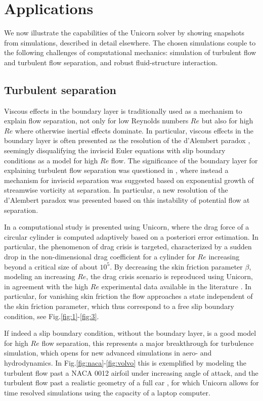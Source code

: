 \section{Applications}

We now illustrate the capabilities of the Unicorn solver by showing
snapshots from simulations, described in detail elsewhere. The chosen
simulations couple to the following challenges of computational
mechanics: simulation of turbulent flow and turbulent flow separation,
and robust fluid-structure interaction.

\subsection{Turbulent separation}

Viscous effects in the boundary layer is traditionally used as a
mechanism to explain flow separation, not only for low Reynolds
numbers $Re$ but also for high $Re$ where otherwise inertial effects
dominate. In particular, viscous effects in the boundary layer is
often presented as the resolution of the d'Alembert
paradox \cite{Stewartson1981}, seemingly disqualifying the inviscid
Euler equations with slip boundary conditions as a model for high $Re$
flow.
%
The significance of the boundary layer for explaining turbulent flow
separation was questioned in \cite{HoffmanJohnson2008b}, where instead
a mechanism for inviscid separation was suggested based on exponential
growth of streamwise vorticity at separation. In particular, a new
resolution of the d'Alembert paradox was presented based on this
instability of potential flow at separation.

In \cite{JanssonHoffman2009} a computational study is presented using
Unicorn, where the drag force of a circular cylinder is computed
adaptively based on a posteriori error estimation. In particular, the
phenomenon of drag crisis is targeted, characterized by a sudden drop
in the non-dimensional drag coefficient for a cylinder for $Re$
increasing beyond a critical size of about $10^5$. By decreasing the
skin friction parameter $\beta$, modeling an increasing $Re$, the drag
crisis scenario is reproduced using Unicorn, in agreement with the
high $Re$ experimental data available in the
literature \cite{Zdravkovich2003}. In particular, for vanishing skin
friction the flow approaches a state independent of the skin friction
parameter, which thus correspond to a free slip boundary condition,
see Fig.\ref{fig:1}-\ref{fig:3}.

If indeed a slip boundary condition, without the boundary layer, is a
good model for high $Re$ flow separation, this represents a major
breakthrough for turbulence simulation, which opens for new advanced
simulations in aero- and hydrodynamics. In
Fig.\ref{fig:naca}-\ref{fig:volvo} this is exemplified by modeling the
turbulent flow past a NACA 0012 airfoil under increasing angle of
attack, and the turbulent flow past a realistic geometry of a full
car \cite{HoffmanJohnson2006}, for which Unicorn allows for time
resolved simulations using the capacity of a laptop computer.

